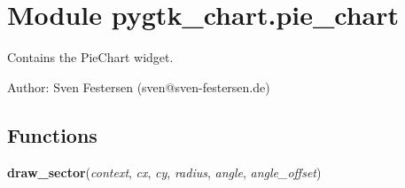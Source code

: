 %
%
%


\section{Module pygtk\_chart.pie\_chart}

    \label{pygtk_chart:pie_chart}
Contains the PieChart widget.

Author: Sven Festersen (sven@sven-festersen.de)



  \subsection{Functions}

    \label{pygtk_chart:pie_chart:draw_sector}

    \vspace{0.5ex}

\hspace{.8\funcindent}\begin{boxedminipage}{\funcwidth}

    \raggedright \textbf{draw\_sector}(\textit{context}, \textit{cx}, \textit{cy}, \textit{radius}, \textit{angle}, \textit{angle\_offset})

\setlength{\parskip}{2ex}
\setlength{\parskip}{1ex}
    \end{boxedminipage}



